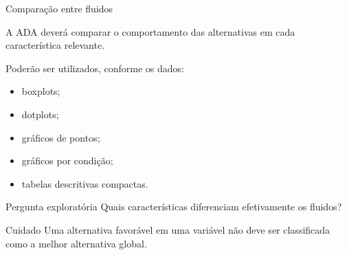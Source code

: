 \begin{frame}{Comparação entre fluidos}

    A ADA deverá comparar o comportamento das alternativas em cada
    característica relevante.

    \vspace{0.3cm}

    Poderão ser utilizados, conforme os dados:

    \begin{itemize}
        \item boxplots;
        \item dotplots;
        \item gráficos de pontos;
        \item gráficos por condição;
        \item tabelas descritivas compactas.
    \end{itemize}

    \vspace{0.3cm}

    \begin{block}{Pergunta exploratória}
        Quais características diferenciam efetivamente os fluidos?
    \end{block}

    \vspace{0.2cm}

    \begin{alertblock}{Cuidado}
        Uma alternativa favorável em uma variável não deve ser
        classificada como a melhor alternativa global.
    \end{alertblock}

\end{frame}



